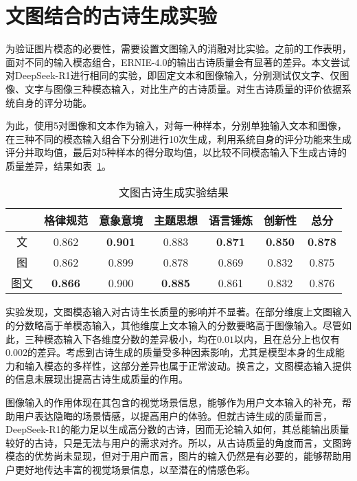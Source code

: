 \section{文图结合的古诗生成实验}

为验证图片模态的必要性，需要设置文图输入的消融对比实验。之前的工作表明，面对不同的输入模态组合，ERNIE-4.0的输出古诗质量会有显著的差异。本文尝试对DeepSeek-R1进行相同的实验，即固定文本和图像输入，分别测试仅文字、仅图像、文字与图像三种模态输入，对比生产的古诗质量。对生古诗质量的评价依据系统自身的评分功能。

为此，使用5对图像和文本作为输入，对每一种样本，分别单独输入文本和图像，在三种不同的模态输入组合下分别进行10次生成，利用系统自身的评分功能来生成评分并取均值，最后对5种样本的得分取均值，以比较不同模态输入下生成古诗的质量差异，结果如表~\ref{tab:test_generation_modal}。

\begin{table}[ht]
  \centering
  \caption{文图古诗生成实验结果}
  \label{tab:test_generation_modal}
  \begin{tabular}{ccccccc}
      \toprule
      & 格律规范&	意象意境&	主题思想&	语言锤炼&	创新性&	总分\\
      \midrule
      文	&	0.862 	&	\bf{0.901} 	&	0.883 	&	\bf{0.871} 	&	\bf{0.850} 	&	\bf{0.878} 	\\
      图	&	0.862 	&	0.899 	&	0.878 	&	0.869 	&	0.832 	&	0.875 	\\
      图文	&	\bf{0.866} 	&	0.900 	&	\bf{0.885} 	&	0.861 	&	0.832 	&	0.876 	\\
      \bottomrule
  \end{tabular}
\end{table}

实验发现，文图模态输入对古诗生长质量的影响并不显著。在部分维度上文图输入的分数略高于单模态输入，其他维度上文本输入的分数要略高于图像输入。尽管如此，三种模态输入下各维度分数的差异极小，均在$0.01$以内，且在总分上也仅有$0.002$的差异。考虑到古诗生成的质量受多种因素影响，尤其是模型本身的生成能力和输入模态的多样性，这部分差异也属于正常波动。换言之，文图模态输入提供的信息未展现出提高古诗生成质量的作用。

图像输入的作用体现在其包含的视觉场景信息，能够作为用户文本输入的补充，帮助用户表达隐晦的场景情感，以提高用户的体验。但就古诗生成的质量而言，DeepSeek-R1的能力足以生成高分数的古诗，因而无论输入如何，其总能输出质量较好的古诗，只是无法与用户的需求对齐。所以，从古诗质量的角度而言，文图跨模态的优势尚未显现，但对于用户而言，图片的输入仍然是有必要的，能够帮助用户更好地传达丰富的视觉场景信息，以至潜在的情感色彩。 


